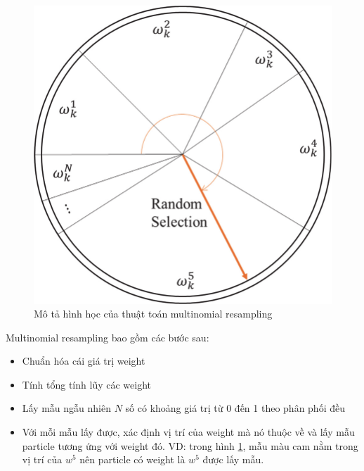 \documentclass[../../main.tex]{subfiles}
\begin{document}
\begin{figure}[ht]
    \begin{center}
        \includegraphics[scale=0.2]{Visualization-of-multinomial-resampling-algorithm.png}
    \end{center}
    \caption{Mô tả hình học của thuật toán multinomial resampling}
    \label{fig:Visualization-of-multinomial-resampling-algorithm}
\end{figure}

Multinomial resampling bao gồm các bước sau:
\begin{itemize}
    \item Chuẩn hóa cái giá trị weight
    \item Tính tổng tính lũy các weight
    \item Lấy mẫu ngẫu nhiên $N$ số  có khoảng giá trị từ 0 đến 1 theo phân phối đều
    \item Với mỗi mẫu lấy được, xác định vị trí của weight mà nó thuộc về và lấy mẫu particle tương ứng với weight đó. VD: trong hình \ref{fig:Visualization-of-multinomial-resampling-algorithm}, mẫu màu cam nằm trong vị trí của $w^5$ nên particle có weight là $w^5$ được lấy mẫu.
\end{itemize}
\end{document}
